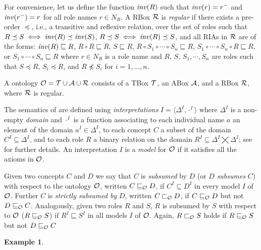 \documentclass[
]{ceurart}
\newtheorem{example}{Example}
\begin{document}
For convenience, let us define the function $\mathit{inv}(R)$ such that $\mathit{inv}(r) = r^-$ and $\mathit{inv}(r^-) = r$ for all role names $r \in N_R$. A RBox $\mathcal{R}$ is \emph{regular} if there exists a pre-order $\preceq$, i.e., a transitive and reflexive relation, over the set of roles such that $R \preceq S \iff \mathit{inv}(R) \preceq \mathit{inv}(S)$, $R \preceq S \iff \mathit{inv}(R) \preceq S$, and all RIAs in $\mathcal{R}$ are of the forms:
$\mathit{inv}(R) \sqsubseteq R$,
$R \circ R \sqsubseteq R$,
$S \sqsubseteq R$, $R \circ S_1 \circ \cdots \circ S_n \sqsubseteq R$,
$S_1 \circ \cdots \circ S_n \circ R \sqsubseteq R$, or
$S_1 \circ \cdots \circ S_n \sqsubseteq R$
where $r \in N_R$ is a role name and $R$, $S$, $S_1, \cdots, S_n$ are roles such that $S \preceq R$, $S_i \preceq R$, and $R \not\preceq S_i$ for $i = 1, \dots, n$.

A \SROIQ ontology $\mathcal{O} = \mathcal{T} \cup \mathcal{A} \cup \mathcal{R}$ consists of a TBox $\mathcal{T}$, an ABox $\mathcal{A}$, and a RBox $\mathcal{R}$, where $\mathcal{R}$ is regular.

The semantics of \SROIQ are defined using \emph{interpretations} $I = \langle \Delta^I, \cdot^I \rangle$ where $\Delta^I$ is a non-empty \emph{domain} and $\cdot^I$ is a function associating to each individual name $a$ an element of the domain $a^I \in \Delta^I$, to each concept $C$ a subset of the domain $C^I \subseteq \Delta^I$, and to each role $R$ a binary relation on the domain $R^I \subseteq \Delta^I \bigtimes \Delta^I$; see \cite{baader_horrocks_lutz_sattler_2017,HorrocksKutzSattlerKR2006} for further details. An interpretation $I$ is a \emph{model} for $\mathcal{O}$ if it satisfies all the axioms in $\mathcal{O}$.

Given two concepts $C$ and $D$ we say that $C$ is \emph{subsumed} by $D$ (or $D$ \emph{subsumes} $C$) with respect to the ontology $\mathcal{O}$, written $C \sqsubseteq_\mathcal{O} D$, if $C^I \subseteq D^I$ in every model $I$ of $\mathcal{O}$. Further $C$ is \emph{strictly subsumed by} $D$, written $C \sqsubset_\mathcal{O} D$, if $C \sqsubseteq_\mathcal{O} D$ but not $D \sqsubseteq_\mathcal{O} C$. Analogously, given two roles $R$ and $S$, $R$ is subsumed by $S$ with respect to $\mathcal{O}$ ($R \sqsubseteq_\mathcal{O} S$) if $R^I \sqsubseteq S^I$ in all models $I$ of $\mathcal{O}$. Again, $R \sqsubset_\mathcal{O} S$ holds if $R \sqsubseteq_\mathcal{O} S$ but not $D \sqsubseteq_\mathcal{O} C$


\begin{example}
\end{example}
\end{document}

